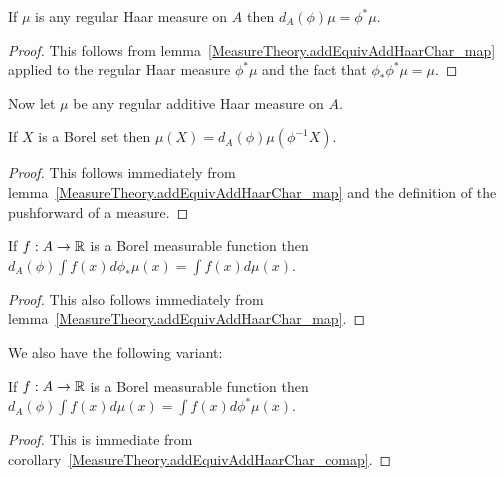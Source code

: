 \begin{corollary}
  \label{MeasureTheory.addEquivAddHaarChar_comap}
  \leanok
  If $\mu$ is any regular Haar measure on $A$ then
  $d_A(\phi)\mu = \phi^*\mu.$
\end{corollary}
\begin{proof}
  \leanok
  This follows from lemma~\ref{MeasureTheory.addEquivAddHaarChar_map}
  applied to the regular Haar measure $\phi^*\mu$ and the fact that $\phi_*\phi^*\mu=\mu$.
\end{proof}

Now let $\mu$ be any regular additive Haar measure on $A$.

\begin{lemma}
  \label{MeasureTheory.addEquivAddHaarChar_smul_preimage}
  \leanok
  If $X$ is a Borel set then $\mu(X)=d_A(\phi)\mu(\phi^{-1}X)$.
\end{lemma}
\begin{proof}
  \leanok
  This follows immediately from lemma~\ref{MeasureTheory.addEquivAddHaarChar_map}
  and the definition of the pushforward of a measure.
\end{proof}

\begin{lemma}
  \label{MeasureTheory.addEquivAddHaarChar_smul_integral_map}
  \leanok
  If $f:A\to\mathbb{R}$ is a Borel measurable function then
  $d_A(\phi)\int f(x)d\phi_*\mu(x)=\int f(x)d\mu(x)$.
\end{lemma}
\begin{proof}
  \leanok
  This also follows immediately from lemma~\ref{MeasureTheory.addEquivAddHaarChar_map}.
\end{proof}

We also have the following variant:

\begin{lemma}
  \label{MeasureTheory.addEquivAddHaarChar_smul_integral_comap}
  \leanok
  If $f:A\to\mathbb{R}$ is a Borel measurable function then
  $d_A(\phi)\int f(x)d\mu(x)=\int f(x)d\phi^*\mu(x)$.
\end{lemma}
\begin{proof}
  \leanok
  This is immediate from corollary~\ref{MeasureTheory.addEquivAddHaarChar_comap}.
\end{proof}

